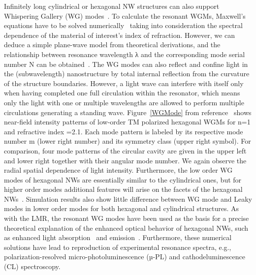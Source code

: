 Infinitely long cylindrical or hexagonal NW structures can also support
Whispering Gallery (WG)
modes~\cite{Zimmler:2008fc,huang2001room,Zhao:2014jt,Nobis:2005wg,Czekalla:2010uw,Gargas:2009cx,Fallert:2008ej,Johnson:2002ua,Nobis:2004tp}.
To calculate the resonant WGMs, Maxwell’s equations have to be solved
numerically~\cite{Wiersig;2003vo} taking into consideration the spectral
dependence of the material of interest’s index of refraction. However, we can
deduce a simple plane-wave model from theoretical derivations, and the
relationship between resonance wavelength λ and the corresponding mode serial
number N can be obtained~\cite{Nobis:2004tp}. The WG modes can also reflect and
confine light in the (subwavelength) nanostructure by total internal reflection
from the curvature of the structure boundaries. However, a light wave can
interfere with itself only when having completed one full circulation within
the resonator, which means only the light with one or multiple wavelengths are
allowed to perform multiple circulations generating a standing wave.
Figure~\ref{WGMode} from reference~\cite{Nobis:2005wg} shows near-field
intensity patterns of low-order TM polarized hexagonal WGMs for n=1 and
refractive index =2.1.  Each mode pattern is labeled by its respective mode
number m (lower right number) and its symmetry class (upper right symbol). For
comparison, four mode patterns of the circular cavity are given in the upper
left and lower right together with their angular mode number. We again observe
the radial spatial dependence of light intensity. Furthermore, the low order WG
modes of hexagonal NWs are essentially similar to the cylindrical ones, but for
higher order modes additional features will arise on the facets of the
hexagonal NWs~\cite{Nobis:2005wg}.  Simulation results also show little
difference between WG mode and Leaky modes in lower order modes for both
hexagonal and cylindrical structures. As with the LMR, the resonant WG modes
have been used as the basis for a precise theoretical explanation of the
enhanced optical behavior of hexagonal NWs, such as enhanced light
absorption~\cite{Cao:2009ho,Kim:2014ig,Zhang:2013wb,Kelzenberg:2010fa,Wang:2013ux}
and emission~\cite{Zimmler:2008fc,Currie:2013to,Le:2014cp,Grzela:2012wa}.
Furthermore, these numerical solutions have lead to reproduction of
experimental resonance spectra, e.g., polarization-resolved
micro-photoluminescence (µ-PL) and cathodeluminescence (CL) spectroscopy.


